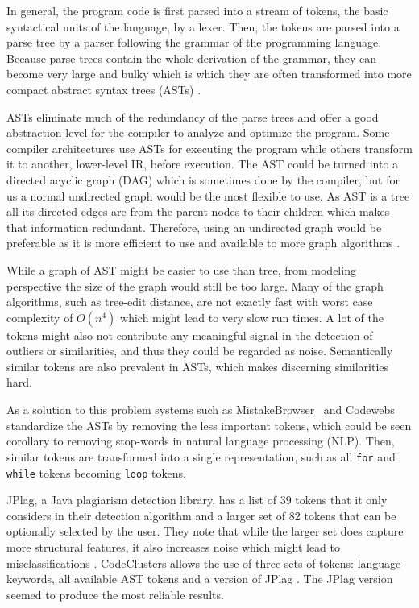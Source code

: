 In general, the program code is first parsed into a stream of tokens, the basic syntactical units of the language, by a lexer. Then, the tokens are parsed into a parse tree by a parser following the grammar of the programming language. Because parse trees contain the whole derivation of the grammar, they can become very large and bulky which is which they are often transformed into more compact abstract syntax trees (ASTs) \cite{aho2007compilers, engineering-compiler}.

ASTs eliminate much of the redundancy of the parse trees and offer a good abstraction level for the compiler to analyze and optimize the program. Some compiler architectures use ASTs for executing the program while others transform it to another, lower-level IR, before execution. The AST could be turned into a directed acyclic graph (DAG) which is sometimes done by the compiler, but for us a normal undirected graph would be the most flexible to use. As AST is a tree all its directed edges are from the parent nodes to their children which makes that information redundant. Therefore, using an undirected graph would be preferable as it is more efficient to use and available to more graph algorithms \cite{aho2007compilers, engineering-compiler}.

While a graph of AST might be easier to use than tree, from modeling perspective the size of the graph would still be too large. Many of the graph algorithms, such as tree-edit distance, are not exactly fast with worst case complexity of $O(n^4)$ \cite{ted-tutorial-2018} which might lead to very slow run times. A lot of the tokens might also not contribute any meaningful signal in the detection of outliers or similarities, and thus they could be regarded as noise. Semantically similar tokens are also prevalent in ASTs, which makes discerning similarities hard. 

As a solution to this problem systems such as MistakeBrowser~\cite{glassman-reusable-feedback} and Codewebs~\cite{codewebs} standardize the ASTs by removing the less important tokens, which could be seen corollary to removing stop-words in natural language processing (NLP). Then, similar tokens are transformed into a single representation, such as all \texttt{for} and \texttt{while} tokens becoming \texttt{loop} tokens.

JPlag, a Java plagiarism detection library, has a list of 39 tokens that it only considers in their detection algorithm and a larger set of 82 tokens that can be optionally selected by the user. They note that while the larger set does capture more structural features, it also increases noise which might lead to misclassifications \cite{jplag}. CodeClusters allows the use of three sets of tokens: language keywords, all available AST tokens and a version of JPlag \cite{wahlroos-2019}. The JPlag version seemed to produce the most reliable results.

